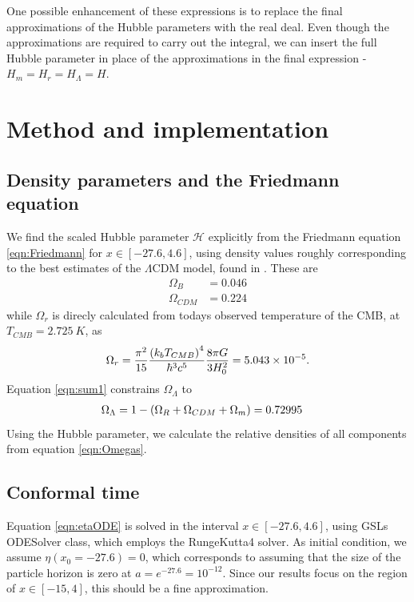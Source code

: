 \documentclass[10pt, a4paper]{article}
\begin{document}
One possible enhancement of these expressions is to replace the final approximations of the Hubble parameters with the real deal. Even though the approximations are required to carry out the integral, we can insert the full Hubble parameter in place of the approximations in the final expression - $H_m = H_r = H_{\Lambda} = H$.


\section{Method and implementation}
\subsection{Density parameters and the Friedmann equation}
We find the scaled Hubble parameter $\mathcal{H}$ explicitly from the Friedmann equation \ref{eqn:Friedmann} for $x \in [-27.6, 4.6]$, using density values roughly corresponding to the best estimates of the $\Lambda$CDM model, found in \cite{callin2006}. These are
\begin{align*}
    \Omega_B &= 0.046 \\
    \Omega_{CDM} &= 0.224
\end{align*}
while $\Omega_r$ is direcly calculated from todays observed temperature of the CMB, at $T_{CMB} = \SI{2.725}{K}$, as
\begin{align*}
    \Omega_r = \frac{\pi^2}{15}\frac{\qty(k_bT_{CMB})^4}{\hbar^3c^5}\frac{8\pi G}{3H_0^2} = 5.043 \times 10^{-5}.
\end{align*}
Equation \ref{eqn:sum1} constrains $\Omega_\Lambda$ to
\begin{align*}
    \Omega_{\Lambda} &= 1 - \qty(\Omega_R + \Omega_{CDM} + \Omega_m) = 0.72995
\end{align*}
Using the Hubble parameter, we calculate the relative densities of all components from equation \ref{eqn:Omegas}.


\subsection{Conformal time}
Equation \ref{eqn:etaODE} is solved in the interval $x \in [-27.6, 4.6]$, using GSLs ODESolver class, which employs the RungeKutta4 solver. As initial condition, we assume $\eta(x_0 = -27.6) = 0$, which corresponds to assuming that the size of the particle horizon is zero at $a=e^{-27.6} = 10^{-12}$. Since our results focus on the region of $x \in [-15, 4]$, this should be a fine approximation.
\end{document}
